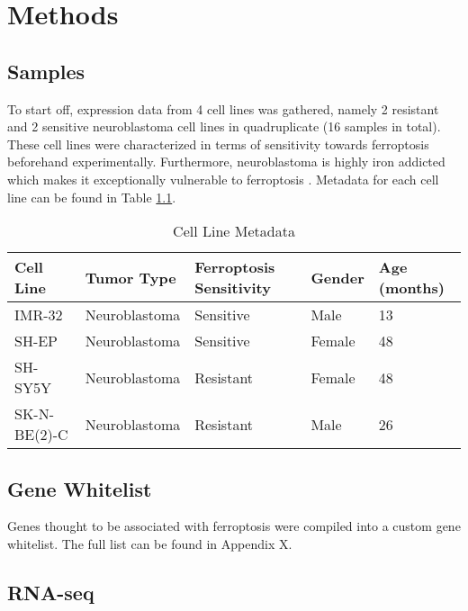 \chapter[Methods]%
{Methods}

\section{Samples}

To start off, expression data from 4 cell lines was gathered, namely 2 resistant and 2 sensitive neuroblastoma cell lines in quadruplicate (16 samples in total). These cell lines were characterized in terms of sensitivity towards ferroptosis beforehand experimentally. Furthermore, neuroblastoma is highly iron addicted which makes it exceptionally vulnerable to ferroptosis \citep{nb_iron}. Metadata for each cell line can be found in Table \ref{tab:cellline_meta}.

\begin{table}[!ht]
    \centering
    \begin{adjustbox}{width=\textwidth}
    \begin{tabular}{|l|l|l|l|l|}
    \hline
        \bfseries Cell Line & \bfseries Tumor Type & \bfseries Ferroptosis Sensitivity & \bfseries Gender & \bfseries Age (months) \\ \hline
        IMR-32 & Neuroblastoma & Sensitive & Male & 13 \\ \hline
        SH-EP & Neuroblastoma & Sensitive & Female & 48 \\ \hline
        SH-SY5Y & Neuroblastoma & Resistant & Female & 48 \\ \hline
        SK-N-BE(2)-C & Neuroblastoma & Resistant & Male & 26 \\ \hline
    \end{tabular}
    \end{adjustbox}
    \caption{Cell Line Metadata}
    \label{tab:cellline_meta}
\end{table}

\section{Gene Whitelist}

Genes thought to be associated with ferroptosis were compiled into a custom gene whitelist. The full list can be found in Appendix X.

\section{RNA-seq}



